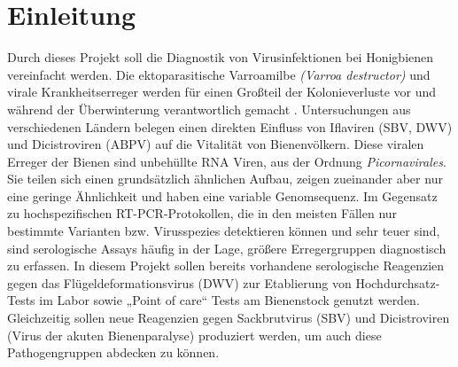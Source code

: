 
\section{Einleitung}
Durch dieses Projekt soll die Diagnostik von Virusinfektionen bei Honigbienen vereinfacht werden. Die ektoparasitische Varroamilbe \textit{(Varroa destructor)} und virale Krankheitserreger werden für einen Großteil der Kolonieverluste vor \citep{dainat2012} und während der Überwinterung verantwortlich gemacht \citep{Kielmanowicz2015}. Untersuchungen aus verschiedenen Ländern belegen einen direkten Einfluss von Iflaviren (SBV, DWV) und Dicistroviren (ABPV) auf die Vitalität von Bienenvölkern. Diese viralen Erreger der Bienen sind unbehüllte RNA Viren, aus der Ordnung \textit{Picornavirales}. Sie teilen sich einen grundsätzlich ähnlichen Aufbau, zeigen zueinander aber nur eine geringe Ähnlichkeit und haben eine variable Genomsequenz. Im Gegensatz zu hochspezifischen RT-PCR-Protokollen, die in den meisten Fällen nur bestimmte Varianten bzw. Virusspezies detektieren können und sehr teuer sind, sind serologische Assays häufig in der Lage, größere Erregergruppen diagnostisch zu erfassen. In diesem Projekt sollen bereits vorhandene serologische Reagenzien gegen das Flügeldeformationsvirus (DWV) zur Etablierung von Hochdurchsatz-Tests im Labor sowie „Point of care“ Tests am Bienenstock genutzt werden. Gleichzeitig sollen neue Reagenzien gegen Sackbrutvirus (SBV) und Dicistroviren (Virus der akuten Bienenparalyse) produziert werden, um auch diese Pathogengruppen abdecken zu können. 



